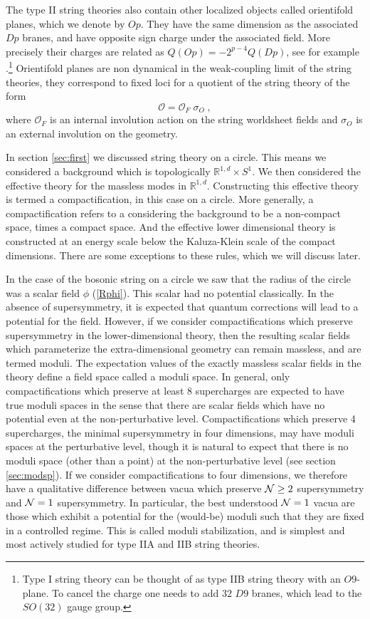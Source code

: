 \documentclass[11pt,a4paper]{article}
\numberwithin{equation}{section}
\numberwithin{table}{section}\setlength{\multlinegap}{25pt}
\newcommand{\cO}{\mathcal{O}}
\newcommand{\be}{\begin{equation}}
\newcommand{\ee}{\end{equation}}
\begin{document}
The type II string theories also contain other localized objects called orientifold planes, which we denote by $Op$. They have the same dimension as the associated $Dp$ branes, and have opposite sign charge under the associated field. More precisely their charges are related as $Q\left(Op\right) = -2^{p-4} Q\left(Dp\right)$, see for example \cite{Blumenhagen:2006ci}.\footnote{Type I string theory can be thought of as type IIB string theory with an $O9$-plane. To cancel the charge one needs to add $32$ $D9$ branes, which lead to the $SO(32)$ gauge group.} Orientifold planes are non dynamical in the weak-coupling limit of the string theories, they correspond to fixed loci for a quotient of the string theory of the form 
\be
\cO = \cO_{F} \;\sigma_O \;,
\label{oplaneac}
\ee 
where $\cO_F$ is an internal involution action on the string worldsheet fields and $\sigma_O$ is an external involution on the geometry.

In section \ref{sec:first} we discussed string theory on a circle. This means we considered a background which is topologically $\mathbb{R}^{1,d} \times S^1$. We then considered the effective theory for the massless modes in $\mathbb{R}^{1,d}$. Constructing this effective theory is termed a compactification, in this case on a circle. More generally, a compactification refers to a considering the background to be a non-compact space, times a compact space. And the effective lower dimensional theory is constructed at an energy scale below the Kaluza-Klein scale of the compact dimensions. There are some exceptions to these rules, which we will discuss later. 

In the case of the bosonic string on a circle we saw that the radius of the circle was a scalar field $\phi$ (\ref{Rphi}). This scalar had no potential classically. In the absence of supersymmetry, it is expected that quantum corrections will lead to a potential for the field. However, if we consider compactifications which preserve supersymmetry in the lower-dimensional theory, then the resulting scalar fields which parameterize the extra-dimensional geometry can remain massless, and are termed moduli. The expectation values of the exactly massless scalar fields in the theory define a field space called a moduli space.  In general, only compactifications which preserve at least 8 supercharges are expected to have true moduli spaces in the sense that there are scalar fields which have no potential even at the non-perturbative level. Compactifications which preserve 4 supercharges, the minimal supersymmetry in four dimensions, may have moduli spaces at the perturbative level, though it is natural to expect that there is no moduli space (other than a point) at the non-perturbative level (see section \ref{sec:modsp}). If we consider compactifications to four dimensions, we therefore have a qualitative difference between vacua which preserve ${\cal N} \geq 2$ supersymmetry and ${\cal N}=1$ supersymmetry. In particular, the best understood ${\cal N}=1$ vacua are those which exhibit a potential for the (would-be) moduli such that they are fixed in a controlled regime. This is called moduli stabilization, and is simplest and most actively studied for type IIA and IIB string theories. 
\end{document}
